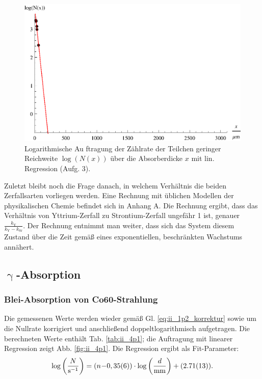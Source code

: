 \begin{figure}[tb]
	\centering
	\includegraphics[scale=1.0]{fig/ii_3_plotc.eps}
	\caption{Logarithmische Au
	ftragung der Zählrate der Teilchen geringer Reichweite $\log(N(x))$ über die Absorberdicke $x$ mit lin. Regression (Aufg. 3).}
	\label{fig:ii_3_plotc}
\end{figure}

Zuletzt bleibt noch die Frage danach, in welchem Verhältnis die beiden Zerfallsarten vorliegen werden. Eine Rechnung mit üblichen Modellen der physikalischen Chemie befindet sich in Anhang A.
Die Rechnung ergibt, dass das Verhältnis von Yttrium-Zerfall zu Strontium-Zerfall ungefähr 1 ist, genauer $\frac{k_\mathrm{Y}}{k_\mathrm{Y} - k_\mathrm{Sr}}$. Der Rechnung entnimmt man weiter, dass sich das System diesem Zustand über die Zeit gemäß eines exponentiellen, beschränkten Wachstums annähert.

\FloatBarrier
\subsection{\texorpdfstring{$\upgamma$}{Gamma}-Absorption}
\subsubsection{Blei-Absorption von Co60-Strahlung}
Die gemessenen Werte werden wieder gemäß Gl. \eqref{eq:ii_1p2_korrektur} sowie um die Nullrate korrigiert und anschließend doppeltlogarithmisch aufgetragen. Die berechneten Werte enthält Tab. \ref{tab:ii_4p1}; die Auftragung mit linearer Regression zeigt Abb. \ref{fig:ii_4p1}. Die Regression ergibt als Fit-Parameter:
\begin{equation}
\log\left(\frac{N}{\si{\per\second}}\right) = (\numb{-0,35(6)}) \cdot \log\left(\frac{d}{\si{mm}}\right) + (\num{2,71(13)}).
\end{equation}

